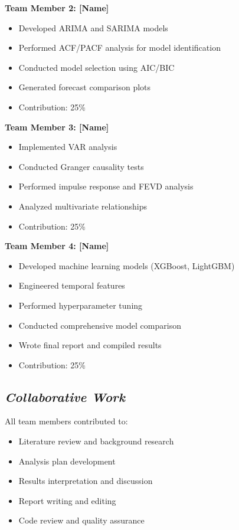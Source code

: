\documentclass[12pt]{article}
\begin{document}
\textbf{Team Member 2: [Name]}
\begin{itemize}
    \item Developed ARIMA and SARIMA models
    \item Performed ACF/PACF analysis for model identification
    \item Conducted model selection using AIC/BIC
    \item Generated forecast comparison plots
    \item Contribution: 25\%
\end{itemize}

\textbf{Team Member 3: [Name]}
\begin{itemize}
    \item Implemented VAR analysis
    \item Conducted Granger causality tests
    \item Performed impulse response and FEVD analysis
    \item Analyzed multivariate relationships
    \item Contribution: 25\%
\end{itemize}

\textbf{Team Member 4: [Name]}
\begin{itemize}
    \item Developed machine learning models (XGBoost, LightGBM)
    \item Engineered temporal features
    \item Performed hyperparameter tuning
    \item Conducted comprehensive model comparison
    \item Wrote final report and compiled results
    \item Contribution: 25\%
\end{itemize}

\subsection*{\textit{Collaborative Work}}

All team members contributed to:
\begin{itemize}
    \item Literature review and background research
    \item Analysis plan development
    \item Results interpretation and discussion
    \item Report writing and editing
    \item Code review and quality assurance
\end{itemize}
\end{document}
